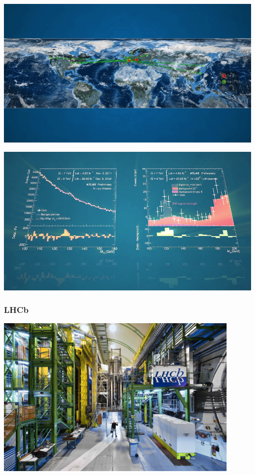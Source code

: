 \documentclass{beamer}
\begin{document}
\begin{frame}
    \includegraphics[width=\textwidth]{video/grid.png}
\end{frame}

\begin{frame}
    \includegraphics[width=\textwidth]{video/graphs.png}
\end{frame}

\begin{frame}
    \frametitle{LHCb}

    \centering
    \includegraphics[width=0.9\textwidth]{LHCb.jpg}
\end{frame}
\end{document}
